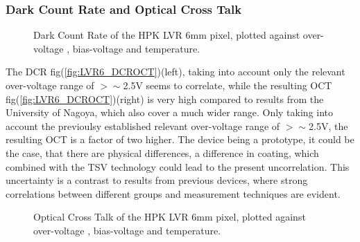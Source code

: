 \documentclass[12pt,article,type=msc,colorback,accentcolor=tud9c]{tudthesis}
\begin{document}
\subsubsection{Dark Count Rate and Optical Cross Talk}
\label{subsubsec:LVR6DCROCT}
\begin{figure}[h]
\begin{centering}
\caption[LCT5 LVR 6mm DCR]{Dark Count Rate of the HPK LVR 6mm pixel, plotted against over-voltage , bias-voltage and temperature.}
\label{fig:LVR6_DCR}
\end{centering}
\end{figure}
The DCR fig(\ref{fig:LVR6_DCROCT})(left), taking into account only the relevant over-voltage range of $>\sim$2.5V seems to correlate, while the resulting OCT fig(\ref{fig:LVR6_DCROCT})(right) is very high compared to results from the University of Nagoya, which also cover a much wider range. Only taking into account the previoulsy established relevant over-voltage range of $>\sim$2.5V, the resulting OCT is a factor of two higher. The device being a prototype, it could be the case, that there are physical differences, a difference in coating, which combined with the TSV technology could lead to the present uncorrelation\cite{Yamamoto}. This uncertainty is a contrast to results from previous devices, where strong correlations between different groups and measurement techniques are evident.
\begin{figure}[h]
\begin{centering}
\caption[LCT5 LVR 6mm OCT]{Optical Cross Talk of the HPK LVR 6mm pixel, plotted against over-voltage , bias-voltage and temperature.}
\label{fig:LVR6_OCT}
\end{centering}
\end{figure}


\clearpage
\end{document}
